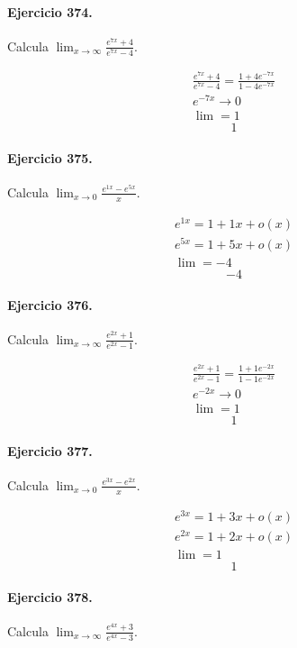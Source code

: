 \documentclass[11pt,a4paper]{article}
\begin{document}
\paragraph{Ejercicio 374.} Calcula $\displaystyle\lim_{x\to\infty}\frac{e^{7x}+4}{e^{7x}-4}$.

\[
\begin{aligned}
\frac{e^{7x}+4}{e^{7x}-4}=\frac{1+4e^{-7x}}{1-4e^{-7x}}\\
e^{-7x}\to0\\
\lim=1
\end{aligned}
\]
\[\boxed{1}\]


\paragraph{Ejercicio 375.} Calcula $\displaystyle\lim_{x\to0}\frac{e^{1x}-e^{5x}}{x}$.

\[
\begin{aligned}
e^{1x}=1+1x+o(x)\\
e^{5x}=1+5x+o(x)\\
\lim=-4
\end{aligned}
\]
\[\boxed{-4}\]


\paragraph{Ejercicio 376.} Calcula $\displaystyle\lim_{x\to\infty}\frac{e^{2x}+1}{e^{2x}-1}$.

\[
\begin{aligned}
\frac{e^{2x}+1}{e^{2x}-1}=\frac{1+1e^{-2x}}{1-1e^{-2x}}\\
e^{-2x}\to0\\
\lim=1
\end{aligned}
\]
\[\boxed{1}\]


\paragraph{Ejercicio 377.} Calcula $\displaystyle\lim_{x\to0}\frac{e^{3x}-e^{2x}}{x}$.

\[
\begin{aligned}
e^{3x}=1+3x+o(x)\\
e^{2x}=1+2x+o(x)\\
\lim=1
\end{aligned}
\]
\[\boxed{1}\]


\paragraph{Ejercicio 378.} Calcula $\displaystyle\lim_{x\to\infty}\frac{e^{4x}+3}{e^{4x}-3}$.
\end{document}
